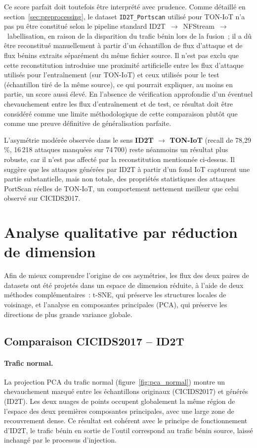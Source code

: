 \documentclass[12pt, a4paper]{report}
\begin{document}
Ce score parfait doit toutefois être interprété avec prudence. Comme
détaillé en section~\ref{sec:preprocessing}, le dataset
\texttt{ID2T\_Portscan} utilisé pour TON-IoT n'a pas pu être constitué
selon le pipeline standard ID2T~$\rightarrow$~NFStream~$\rightarrow$~labellisation,
en raison de la disparition du trafic bénin lors de la fusion~; il a
dû être reconstitué manuellement à partir d'un échantillon de flux
d'attaque et de flux bénins extraits séparément du même fichier
source. Il n'est pas exclu que cette reconstitution introduise une
proximité artificielle entre les flux d'attaque utilisés pour
l'entraînement (sur TON-IoT) et ceux utilisés pour le test (échantillon
tiré de la même source), ce qui pourrait expliquer, au moins en partie,
un score aussi élevé. En l'absence de vérification approfondie d'un
éventuel chevauchement entre les flux d'entraînement et de test, ce
résultat doit être considéré comme une limite méthodologique de cette
comparaison plutôt que comme une preuve définitive de généralisation
parfaite.
 
L'asymétrie modérée observée dans le sens \textbf{ID2T
$\rightarrow$ TON-IoT} (recall de 78,29\,\%, 16\,218 attaques
manquées sur 74\,700) reste néanmoins un résultat plus robuste, car il
n'est pas affecté par la reconstitution mentionnée ci-dessus. Il
suggère que les attaques générées par ID2T à partir d'un fond IoT
capturent une partie substantielle, mais non totale, des
propriétés statistiques des attaques PortScan réelles de TON-IoT,
un comportement nettement meilleur que celui observé sur CICIDS2017.
 
\section{Analyse qualitative par réduction de dimension}
\label{sec:qualitative_analysis}
 
Afin de mieux comprendre l'origine de ces asymétries, les flux des
deux paires de datasets ont été projetés dans un espace de dimension
réduite, à l'aide de deux méthodes complémentaires~: t-SNE, qui
préserve les structures locales de voisinage, et l'analyse en
composantes principales (PCA), qui préserve les directions de plus
grande variance globale.
 
\subsection{Comparaison CICIDS2017 -- ID2T}
 
\paragraph{Trafic normal.} La projection PCA du trafic normal
(figure~\ref{fig:pca_normal}) montre un chevauchement marqué entre les
échantillons originaux (CICIDS2017) et générés (ID2T). Les deux
nuages de points occupent globalement la même région de l'espace des
deux premières composantes principales, avec une large zone de
recouvrement dense. Ce résultat est cohérent avec le principe de
fonctionnement d'ID2T, le trafic bénin en sortie de l'outil
correspond au trafic bénin source, laissé inchangé par le processus
d'injection.
 
\end{document}
